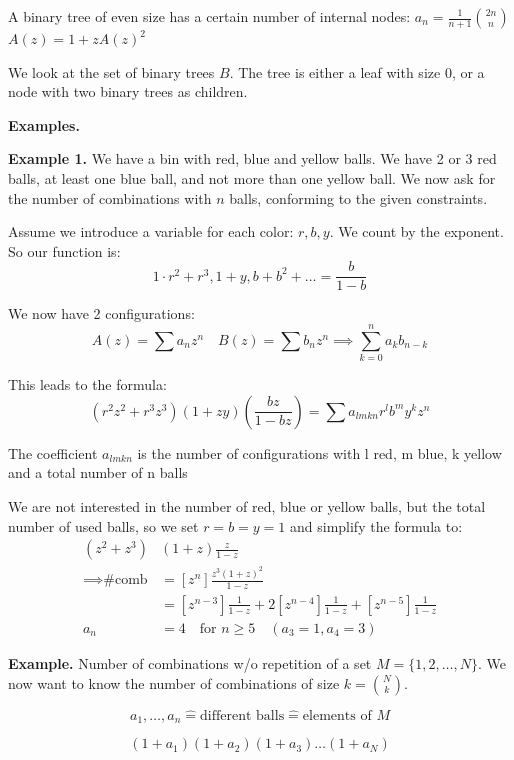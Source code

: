 
A binary tree of even size has a certain number of internal nodes: $\displaystyle{a_n = \frac{1}{n+1} {2n \choose n}}$\\
$A(z) = 1 + zA(z)^2$

We look at the set of binary trees $B$. The tree is either a leaf with size 0, or a node with two binary trees as children.

\textbf{Examples.}

\textbf{Example 1.}
We have a bin with red, blue and yellow balls. We have 2 or 3 red balls, at least one blue ball, and not more than one yellow ball. We now ask for the number of combinations with $n$ balls, conforming to the given constraints.

Assume we introduce a variable for each color: $r,b,y$. We count by the exponent. So our function is:
\[
    1\cdot r^2 + r^3,  1+y, b + b^2 + \ldots = \frac{b}{1-b}
\]

We now have 2 configurations:
\[
    A(z) = \sum a_n z^n \quad
    B(z) = \sum b_n z^n
    \implies \sum_{k=0}^{n} a_k b_{n-k}
\]

This leads to the formula:
\[
    (r^2  z^2+ r^3 z^3) (1+zy) \left(\frac{bz}{1-bz}\right)
    = \sum a_{lmkn} r^l b^m y^k z^n
\]

The coefficient $a_{lmkn}$ is the number of configurations with l red, m blue, k yellow and a total number of n balls

We are not interested in the number of red, blue or yellow balls, but the total number of used balls, so we set $r=b=y=1$ and simplify the formula to:
\begin{align*}
    (z^2 + z^3)&(1+z) \frac{z}{1-z} \\
    \implies \text{\# comb}
    &= \left[z^n\right] \frac{z^3(1+z)^2}{1-z} \\
    &= \left[z^{n-3}\right] \frac{1}{1-z}+ 2\left[z^{n-4}\right] \frac{1}{1-z} + \left[z^{n-5}\right] \frac{1}{1-z} \\
    a_n &= 4 \quad \text{for } n ≥ 5 \quad (a_3=1, a_4=3)
\end{align*}

\textbf{Example.}
Number of combinations w/o repetition of a set $M = \{1,2, \ldots ,N\}$. We now want to know the number of combinations of size $k = {N \choose k}$.

\[
    a_1, \ldots , a_n \mathrel{\hat{=}} \text{different balls} \mathrel{\hat{=}} \text{elements of } M
\]

\[
    (1+a_1)(1+a_2)(1+a_3) \ldots (1+a_N)
\]

